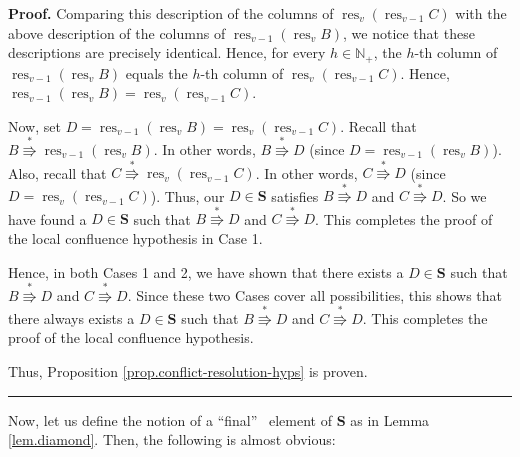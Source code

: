 \documentclass[numbers=enddot,12pt,final,onecolumn,notitlepage]{scrartcl}%
\theoremstyle{definition}
\newenvironment{proof}[1][Proof]{\noindent\textbf{#1.} }{\ \rule{0.5em}{0.5em}}
\newenvironment{verlong}{}{}
\begin{document}
\begin{verlong}
\begin{proof}
Comparing this description of the columns of $\operatorname*{res}%
\nolimits_{v}\left(  \operatorname*{res}\nolimits_{v-1}C\right)  $ with the
above description of the columns of $\operatorname*{res}\nolimits_{v-1}\left(
\operatorname*{res}\nolimits_{v}B\right)  $, we notice that these descriptions
are precisely identical. Hence, for every $h\in\mathbb{N}_{+}$, the $h$-th
column of $\operatorname*{res}\nolimits_{v-1}\left(  \operatorname*{res}%
\nolimits_{v}B\right)  $ equals the $h$-th column of $\operatorname*{res}%
\nolimits_{v}\left(  \operatorname*{res}\nolimits_{v-1}C\right)  $. Hence,
$\operatorname*{res}\nolimits_{v-1}\left(  \operatorname*{res}\nolimits_{v}%
B\right)  =\operatorname*{res}\nolimits_{v}\left(  \operatorname*{res}%
\nolimits_{v-1}C\right)  $.

Now, set $D=\operatorname*{res}\nolimits_{v-1}\left(  \operatorname*{res}%
\nolimits_{v}B\right)  =\operatorname*{res}\nolimits_{v}\left(
\operatorname*{res}\nolimits_{v-1}C\right)  $. Recall that $B\overset{\ast
}{\Rrightarrow}\operatorname*{res}\nolimits_{v-1}\left(  \operatorname*{res}%
\nolimits_{v}B\right)  $. In other words, $B\overset{\ast}{\Rrightarrow}D$
(since $D=\operatorname*{res}\nolimits_{v-1}\left(  \operatorname*{res}%
\nolimits_{v}B\right)  $). Also, recall that $C\overset{\ast}{\Rrightarrow
}\operatorname*{res}\nolimits_{v}\left(  \operatorname*{res}\nolimits_{v-1}%
C\right)  $. In other words, $C\overset{\ast}{\Rrightarrow}D$ (since
$D=\operatorname*{res}\nolimits_{v}\left(  \operatorname*{res}\nolimits_{v-1}%
C\right)  $). Thus, our $D\in\mathbf{S}$ satisfies $B\overset{\ast
}{\Rrightarrow}D$ and $C\overset{\ast}{\Rrightarrow}D$. So we have found a
$D\in\mathbf{S}$ such that $B\overset{\ast}{\Rrightarrow}D$ and
$C\overset{\ast}{\Rrightarrow}D$. This completes the proof of the local
confluence hypothesis in Case 1.

Hence, in both Cases 1 and 2, we have shown that there exists a $D\in
\mathbf{S}$ such that $B\overset{\ast}{\Rrightarrow}D$ and $C\overset{\ast
}{\Rrightarrow}D$. Since these two Cases cover all possibilities, this shows
that there always exists a $D\in\mathbf{S}$ such that $B\overset{\ast
}{\Rrightarrow}D$ and $C\overset{\ast}{\Rrightarrow}D$. This completes the
proof of the local confluence hypothesis.

Thus, Proposition \ref{prop.conflict-resolution-hyps} is proven.
\end{proof}
\end{verlong}

Now, let us define the notion of a \textquotedblleft final\textquotedblright%
\ element of $\mathbf{S}$ as in Lemma \ref{lem.diamond}. Then, the following
is almost obvious:
\end{document}

